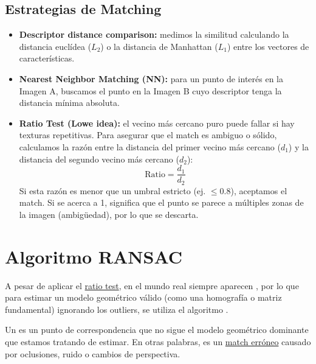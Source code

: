 \subsection{Estrategias de Matching}
\begin{itemize}
    \item \textbf{Descriptor distance comparison:} medimos la similitud calculando la distancia euclídea ($L_2$) o la distancia de Manhattan ($L_1$) entre los vectores de características.
    \item \textbf{Nearest Neighbor Matching (NN):} para un punto de interés en la Imagen A, buscamos el punto en la Imagen B cuyo descriptor tenga la distancia mínima absoluta.
    \item \textbf{Ratio Test (Lowe idea):} el vecino más cercano puro puede fallar si hay texturas repetitivas. Para asegurar que el match es ambiguo o sólido, calculamos la razón entre la distancia del primer vecino más cercano ($d_1$) y la distancia del segundo vecino más cercano ($d_2$):
    $$\text{Ratio} = \frac{d_1}{d_2}$$
    Si esta razón es menor que un umbral estricto (ej. $\le 0.8$), aceptamos el match. Si se acerca a 1, significa que el punto se parece a múltiples zonas de la imagen (ambigüedad), por lo que se descarta.
\end{itemize}

\section{Algoritmo RANSAC}

\noindent
A pesar de aplicar el \underline{ratio test}, en el mundo real siempre aparecen , por lo que para estimar un modelo geométrico válido (como una homografía o matriz fundamental) ignorando los outliers, se utiliza el algoritmo . \\

\begin{definicion}
    Un  es un punto de correspondencia que no sigue el modelo geométrico dominante que estamos tratando de estimar. En otras palabras, es un \underline{match erróneo} causado por oclusiones, ruido o cambios de perspectiva.
\end{definicion}

